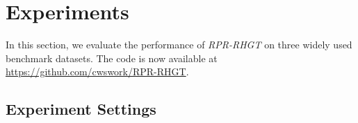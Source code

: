\documentclass{article}
\begin{document}
\section{Experiments}
\label{sec4}
In this section, we evaluate the performance of \textit{RPR-RHGT} on three widely used benchmark datasets.
The code is now available at \url{https://github.com/cwswork/RPR-RHGT}.

\subsection{Experiment Settings}

\begin{table}[t]
	\footnotesize
	\centering
\end{table}
\end{document}
